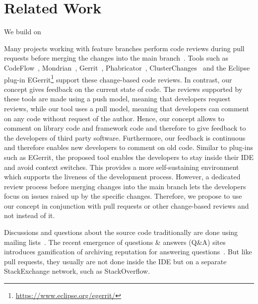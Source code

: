 
\section{Related Work}
We build on \cite{Duerschmid2017CCR}


Many projects working with feature branches perform code reviews during pull requests before merging the changes into the main branch~\cite{driessen2010successful, calefato2015PLE, yu2015pullrequests, tsay2014contributionGithub, gousios2014PullBasedSD, rahman2014pullrequests, tsay2014ContributionDiscussion}. 
%
Tools such as CodeFlow~\cite{bird2015CodeReviewPlatform}, Mondrian~\cite{kennedy2006Mondrian}, Gerrit~\cite{google2016gerrit},  Phabricator~\cite{tsotsis2011Phabricator}, ClusterChanges~\cite{barnett2015helpingdevelopers} and the Eclipse plug-in EGerrit\footnote{\url{https://www.eclipse.org/egerrit/}} support these change-based code reviews.
%
In contrast, our concept gives feedback on the current state of code. 
%
The reviews supported by these tools are made using a push model, meaning that developers request reviews, while our tool uses a pull model, meaning that developers can comment on any code without request of the author.
%
Hence, our concept allows to comment on library code and framework code and therefore to give feedback to the developers of third party software. 
%
Furthermore, our feedback is continuous and therefore enables new developers to comment on old code. 
%
Similar to plug-ins such as EGerrit, the proposed tool enables the developers to stay inside their IDE and avoid context switches.
%
This provides a more self-sustaining environment which supports the liveness of the development process. 
%
However, a dedicated review process before merging changes into the main branch lets the developers focus on issues raised up by the specific changes. 
%
Therefore, we propose to use our concept in conjunction with pull requests or other change-based reviews and not instead of it.
%

%
Discussions and questions about the source code traditionally are done using mailing lists~\cite{vasilescu2014QA}.
%
The recent emergence of questions \& answers (Q\&A) sites introduces gamification of archiving reputation for answering questions~\cite{vasilescu2014QA}.
%
But like pull requests, they usually are not done inside the IDE but on a separate StackExchange network, such as StackOverflow.